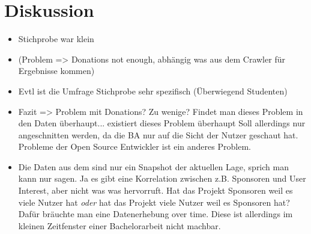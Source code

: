 \chapter{Diskussion}

\begin{itemize}
    \item Stichprobe war klein
    \item (Problem => Donations not enough, abhängig was aus dem Crawler für Ergebnisse kommen)
    \item Evtl ist die Umfrage Stichprobe sehr spezifisch (Überwiegend Studenten)
    \item Fazit => Problem mit Donations? Zu wenige?
          Findet man dieses Problem in den Daten überhaupt... existiert dieses Problem überhaupt
          Soll allerdings nur angeschnitten werden, da die BA nur auf die Sicht der Nutzer geschaut hat.
          Probleme der Open Source Entwickler ist ein anderes Problem.
    \item Die Daten aus dem  sind nur ein Snapshot der aktuellen Lage, sprich man kann
          nur sagen. Ja es gibt eine Korrelation zwischen z.B. Sponsoren und User Interest, aber nicht was was hervorruft.
          Hat das Projekt Sponsoren weil es viele Nutzer hat \textit{oder} hat das Projekt viele Nutzer weil es Sponsoren hat?
          Dafür bräuchte man eine Datenerhebung over time. 
          Diese ist allerdings im kleinen Zeitfenster einer Bachelorarbeit nicht machbar.
\end{itemize}